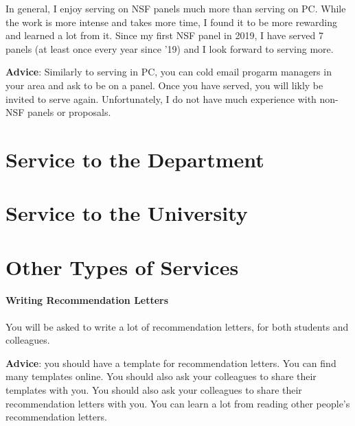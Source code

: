 \documentclass[oneside,11pt]{memoir}
\begin{document}
In general, I enjoy serving on NSF panels much more than serving on PC. While the work is more intense and takes more time, I found it to be more rewarding and learned a lot from it. Since my first NSF panel in 2019, I have served 7 panels (at least once every year since '19) and I look forward to serving more.


\textbf{Advice}: Similarly to serving in PC, you can cold email progarm managers in your area and ask to be on a panel. Once you have served, you will likly be invited to serve again.  Unfortunately, I do not have much experience with non-NSF panels or proposals.


\section{Service to the Department}
\section{Service to the University}
\section{Other Types of Services}
\paragraph{Writing Recommendation Letters} You will be asked to write a lot of recommendation letters, for both students and colleagues.

\textbf{Advice}: you should have a template for recommendation letters.  You can find many templates online.  You should also ask your colleagues to share their templates with you.  You should also ask your colleagues to share their recommendation letters with you.  You can learn a lot from reading other people's recommendation letters.




\end{document}
